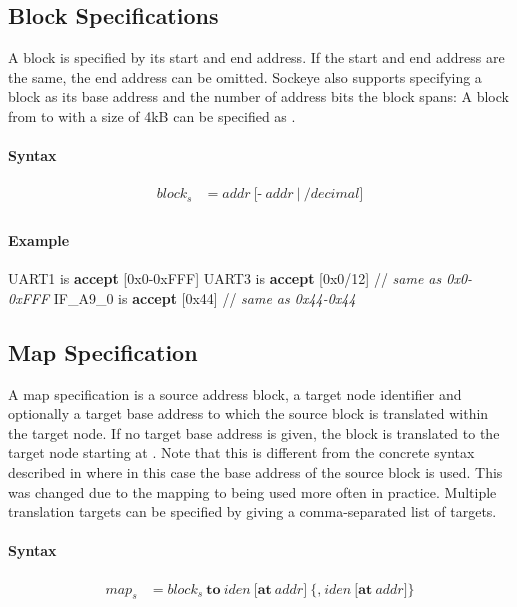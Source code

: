 \documentclass[a4paper,11pt,twoside]{report}
\begin{document}
{{{\subsection{Block Specifications}
A block is specified by its start and end address.
If the start and end address are the same, the end address can be omitted.
Sockeye also supports specifying a block as its base address and the number of address bits the block spans:
A block from  to  with a size of 4kB can be specified as .

\paragraph{Syntax}
\begin{align*}
\textit{block}_s & \mathop{=} \textit{addr}\
    \Big[
        \textbf{-}\ \textit{addr}\ 
    \Big|\
        \textbf{/}\textit{decimal}
    \Big] \\
\end{align*}

\paragraph{Example}
\begin{example}
    UART1 is \textbf{accept} [0x0-0xFFF]
    UART3 is \textbf{accept} [0x0/12]    // \textit{same as \textup{0x0-0xFFF}}
    IF_A9_0 is \textbf{accept} [0x44]      // \textit{same as \textup{0x44-0x44}}
\end{example}

\subsection{Map Specification}
A map specification is a source address block, a target node identifier and optionally a target base address to which the source block is translated within the target node.
If no target base address is given, the block is translated to the target node starting at .
Note that this is different from the concrete syntax described in \cite{achermann:mars17} where in this case the base address of the source block is used.
This was changed due to the mapping to \Sockeye{0x0} being used more often in practice.
Multiple translation targets can be specified by giving a comma-separated list of targets.

\paragraph{Syntax}
\begin{align*}
\textit{map}_s & \mathop{=}
\textit{block}_s\ \textbf{to}\ \textit{iden}\ 
    \Big[
        \textbf{at}\ \textit{addr}
    \Big]\
    \Big\{
        \textbf{,}\ \textit{iden}\ 
        \Big[
            \textbf{at}\ \textit{addr}
        \Big]
    \Big\}\\
\end{align*}

}}}
\end{document}
